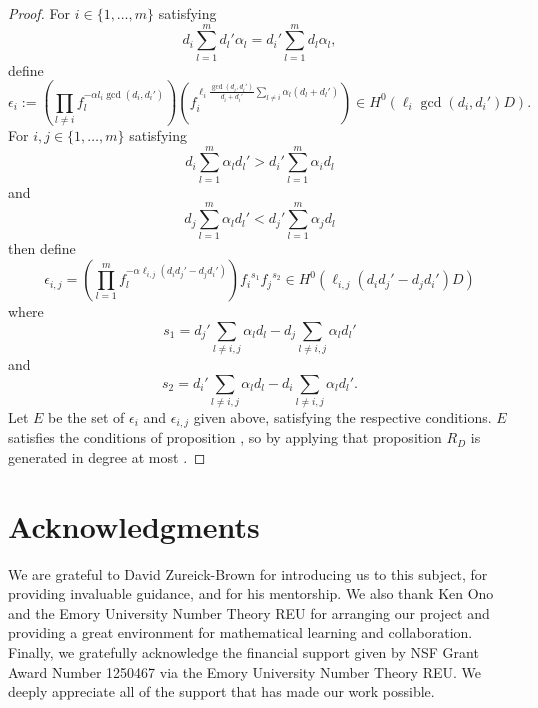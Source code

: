 \documentclass{amsart}
\theoremstyle{plain}
\theoremstyle{definition}
\theoremstyle{remark}
\numberwithin{equation}{section}
\begin{document}
\begin{proof}
For $i \in \{1, \ldots, m\}$ satisfying 
\begin{equation}\label{eqn:condition-for-e_i}
	d_i \sum_{l=1}^m d_l' \alpha_l = d_i' \sum_{l=1}^m d_l \alpha_l,
\end{equation}
define
\[
	\epsilon_i := (\prod_{l \ne i} f_l^{-\alpha l_i \gcd(d_i, d_i')}) (f_i^{\ell_i \frac{\gcd(d_i, d_i')}{d_i + d_i'}\sum_{l \ne i} \alpha_l (d_l + d_l')}) \in H^0(\ell_i \gcd(d_i, d_i') D).
\]
For $i, j \in \{1, \ldots, m\}$ satisfying
\begin{equation}\label{eqn:condition-e_i,j-i}
	d_i \sum_{l=1}^m \alpha_l d_l' > d_i' \sum_{l=1}^m \alpha_i d_l
\end{equation}
and
\begin{equation}\label{eqn:condition-e_i,j-j}
	d_j \sum_{l=1}^m \alpha_l d_l' < d_j' \sum_{l=1}^m \alpha_j d_l
\end{equation}
then define
\[
	\epsilon_{i, j} = (\prod_{l=1}^m f_l^{-\alpha \ell_{i,j} (d_i d_j' - d_j d_i')}) {f_i}^{s_1} {f_j}^{s_2} \in H^0(\ell_{i,j}(d_i d_j' - d_j d_i')D)
\]
where
\[
	s_1 = d_j' \sum_{l \ne i,j} \alpha_l d_l - d_j \sum_{l\ne i, j} \alpha_l d_l'
\]
and
\[
	s_2 = d_i' \sum_{l \ne i,j} \alpha_l d_l - d_i \sum_{l\ne i, j} \alpha_l d_l'.
\]
Let $E$ be the set of $\epsilon_i$ and $\epsilon_{i,j}$ given above, satisfying the respective conditions.
$E$ satisfies the conditions of proposition , so by applying that proposition $R_D$ is generated in degree at most .
\end{proof}



\section{Acknowledgments}

We are grateful to David Zureick-Brown for introducing us to this
subject, for providing invaluable guidance,
and for his mentorship. We also thank Ken Ono and the
Emory University Number Theory REU for arranging our project and
providing a great environment for mathematical learning and
collaboration.
Finally, we gratefully acknowledge the financial support given by
NSF Grant Award Number 1250467 via the Emory University Number
Theory REU. We deeply appreciate all of the support that has made
our work possible.


\nocite{*}
{}

\end{document}
